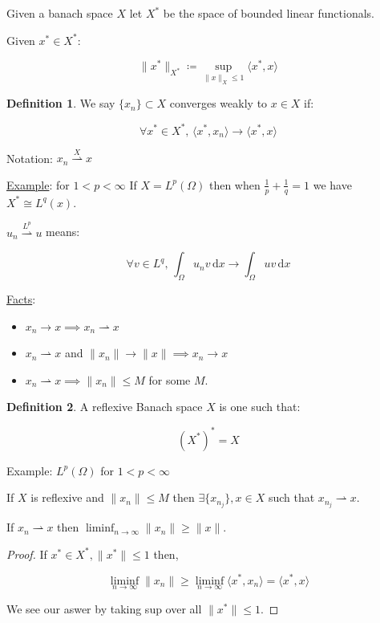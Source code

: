 \documentclass{article}
\theoremstyle{definition}
\newtheorem{definition}{Definition}
\begin{document}
Given a banach space \(X\) let \(X^{\ast}\) be the space of bounded linear functionals.

Given \(x^{\ast} \in X^{\ast}\):

\[
    \lVert x^{\ast} \rVert _{X^{\ast}} \coloneqq \sup_{\lVert x \rVert _X \leq 1} \langle x^{\ast} , x \rangle 
\]

\begin{definition}
    We say \(\{ x_n \} \subset X\) converges weakly to \(x\in X\) if:

    \[
        \forall x^{\ast} \in X^{\ast} ,\,  \langle x^{\ast} , x_n \rangle \to \langle x^{\ast} , x \rangle 
    \]

    Notation: \(x_n \overset{X}{\rightharpoonup} x\)  
\end{definition}

\underline{Example}: for \(1 < p < \infty\)  If \(X = L^p(\Omega)\) then when \(\frac{1}{p} + \frac{1}{q}=1\) we have \(X^{\ast} \cong L^q(x)\).

\(u_n \overset{L^p}{\rightharpoonup} u\) means:

\[
    \forall v\in L^q, \,\int_{\Omega} u_n v \,\mathrm{d}x \to \int_{\Omega} uv \,\mathrm{d}x 
\]

\underline{Facts}:

\begin{itemize}
    \item \(x_n \to x \implies x_n \rightharpoonup x\)
    \item \(x_n \rightharpoonup x\) and \(\lVert x_n \rVert \to \lVert x \rVert \implies x_n \to x\) 
    \item \(x_n \rightharpoonup x \implies \lVert x_n \rVert \leq M\) for some \(M\).  
\end{itemize} 

\begin{definition}
    A reflexive Banach space \(X\) is one such that:

    \[
        (X^{\ast})^{\ast} = X
    \]

    Example: \(L^p(\Omega)\) for \(1 < p < \infty\) 
\end{definition}

If \(X\) is reflexive and \(\lVert x_n \rVert \leq M\) then \(\exists \{ x_{n_j} \} , x \in X\) such that \(x_{n_j}\rightharpoonup x\).

If \(x_n \rightharpoonup x\) then \(\liminf_{n \to \infty} \lVert x_n \rVert \geq \lVert x \rVert \).

\begin{proof}
    If \(x^{\ast} \in X^{\ast}, \lVert x^{\ast} \rVert \leq 1\) then,

    \[
        \liminf_{n \to \infty} \lVert x_n \rVert \geq \liminf_{n \to \infty} \langle x^{\ast} , x_n \rangle = \langle x^{\ast} , x \rangle  
    \]

    We see our aswer by taking sup over all \(\lVert x^{\ast}  \rVert \leq 1\).
\end{proof}
\end{document}
